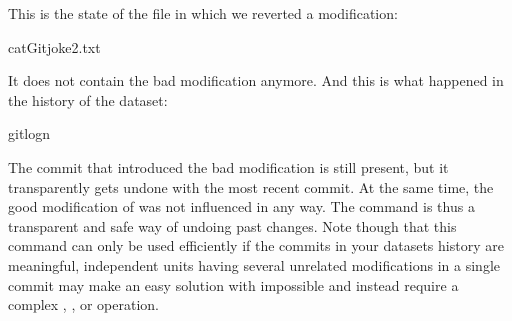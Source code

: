 \sphinxAtStartPar
This is the state of the file in which we reverted a modification:

\begin{sphinxVerbatim}[commandchars=\\\{\}]
catGitjoke2.txt
\end{sphinxVerbatim}

\sphinxAtStartPar
It does not contain the bad modification anymore. And this is what happened in
the history of the dataset:

%
\begin{sphinxVerbatim}[commandchars=\\\{\}]
gitlog\PYGZhy{}n






\end{sphinxVerbatim}
\sphinxresetverbatimhllines

\sphinxAtStartPar
The commit that introduced the bad modification is still present, but it
transparently gets undone with the most recent commit. At the same time, the
good modification of  was not influenced in any way. The
 command is thus a transparent and safe way of undoing past
changes. Note though that this command can only be used efficiently if the
commits in your datasets history are meaningful, independent units \textendash{} having
several unrelated modifications in a single commit may make an easy solution
with  impossible and instead require a complex
, , or  operation.

